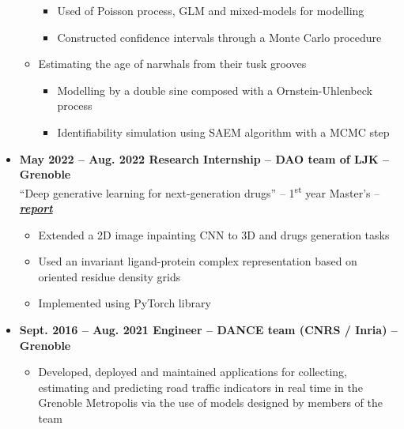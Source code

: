 \documentclass{article}
\begin{document}
\begin{minipage}{0.8\textwidth}
\begin{flushleft}
\begin{itemize}
\begin{itemize}[leftmargin=*]
\begin{itemize}[leftmargin=*]
            \setlength\itemsep{.01cm}
                \item Used of Poisson process, GLM and mixed-models for modelling
                \item Constructed confidence intervals through a Monte Carlo procedure
            \end{itemize}
            \item Estimating the age of narwhals from their tusk grooves
            \vspace{-.15cm}
            \begin{itemize}[leftmargin=*]
            \setlength\itemsep{.01cm}
                \item Modelling by a double sine composed with a Ornstein-Uhlenbeck process
                \item Identifiability simulation using SAEM algorithm with a MCMC step
            \end{itemize}
        \end{itemize}
        \item \textbf{May 2022 – Aug. 2022 \qquad Research Internship – DAO team of LJK – Grenoble} \\
        “Deep generative learning for next-generation drugs” – 1\textsuperscript{st} year Master’s – \textbf{\textit{ \href{https://vadmbertr.github.io/Deep-generative-learning-for-next-generation-drugs/Internship_report___Deep_generative_learning_for_next_generation_drugs.pdf}{report}}}
        \vspace{-.15cm}
        \begin{itemize}[leftmargin=*]
        \setlength\itemsep{.01cm}
            \item Extended a 2D image inpainting CNN to 3D and drugs generation tasks
            \item Used an invariant ligand-protein complex representation based on oriented residue density grids
            \item Implemented using PyTorch library
        \end{itemize}
        \item \textbf{Sept. 2016 – Aug. 2021 \qquad Engineer – DANCE team (CNRS / Inria) – Grenoble}
        \vspace{-.15cm}
        \begin{itemize}[leftmargin=*]
        \setlength\itemsep{.01cm}
            \item Developed, deployed and maintained applications for collecting, estimating and predicting road traffic indicators in real time in the Grenoble Metropolis via the use of models designed by members of the team

\end{itemize}
\end{itemize}
\end{flushleft}
\end{minipage}
\end{document}
